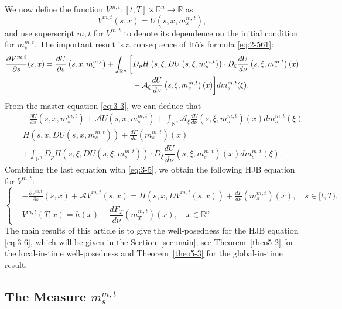 \documentclass[11pt]{article}
\numberwithin{equation}{section}
\newcommand{\br}{\mathbb{R}}
\newcommand{\brn}{{\mathbb{R}^n}}
\newcommand{\1}{\mbox{1\hspace{-1mm}I}}
\begin{document}
We now define the function $V^{m,t}:[t,T]\times\brn\to\br$ as 
\begin{equation}
    V^{m,t}(s,x)=U\left(s,x,m^{m,t}_s\right), \label{eq:3-4}
\end{equation}
and use superscript $m,t$ for $V^{m,t}$ to denote its dependence on the initial condition for $m^{m,t}_s$. The important result is a consequence of It\^o's formula \eqref{eq:2-561}:
\begin{align}
    \dfrac{\partial V^{m,t}}{\partial s}(s,x)= \dfrac{\partial U}{\partial s}\left(s,x,m^{m,t}_s\right)+\int_{\brn}\bigg[& D_{p}H\left(s,\xi,DU\left(s,\xi,m^{m,t}_s\right)\right)\cdot D_{\xi}\frac{dU}{d\nu}\left(s,\xi,m^{m,t}_s\right)(x) \notag \\
    &-\mathcal{A}_{\xi}\dfrac{dU}{d\nu}\left(s,\xi,m^{m,t}_s \right)(x)\bigg]dm^{m,t}_s(\xi). \label{eq:3-5}
\end{align}
From the master equation \eqref{eq:3-3}, we can deduce that 
\begin{align*}
    &-\frac{\partial U}{\partial s}\left(s,x,m^{m,t}_s\right)+\mathcal{A}U\left(s,x,m^{m,t}_s \right)+\int_{\brn} \mathcal{A}_{\xi}\frac{dU}{d\nu}\left(s,\xi,m^{m,t}_s\right)(x)dm^{m,t}_s(\xi)\\
    =\ & H\left(s,x,DU\left(s,x,m^{m,t}_s\right)\right)+\frac{dF}{d\nu}\left(m^{m,t}_s\right)(x)\\
    & +\int_{\brn} D_{p} H\left(s,\xi,DU\left(s,\xi,m^{m,t}_s \right)\right) \cdot D_{\xi}\dfrac{dU}{d\nu}\left(s,\xi,m^{m,t}_s\right)(x)dm^{m,t}_s(\xi).
\end{align*}
Combining the last equation with \eqref{eq:3-5}, we obtain the following HJB equation for $V^{m,t}$:
\begin{equation}\label{eq:3-6}
    \left\{
    \begin{aligned}
        &-\frac{\partial V^{m,t}}{\partial s}(s,x)+\mathcal{A}V^{m,t}(s,x)=H\left(s,x,DV^{m,t}(s,x)\right)+\frac{dF}{d\nu}\left(m^{m,t}_s\right)(x),\quad s\in[t,T),\\
        &V^{m,t}(T,x)=h(x)+\dfrac{dF_T}{d\nu}\left(m^{m,t}_T\right)(x),\quad x\in\brn.
    \end{aligned}
    \right.
\end{equation}
The main results of this article is to give the well-posedness for the HJB equation \eqref{eq:3-6}, which will be given in the Section~\ref{sec:main}; see Theorem~\ref{theo5-2} for the local-in-time well-posedness and Theorem~\ref{theo5-3} for the global-in-time result.

\subsection{The Measure $m^{m,t}_s$}
\end{document}
